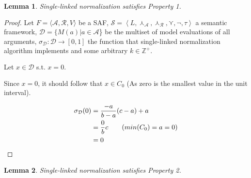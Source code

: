 \documentclass{article}
\newtheorem{lemma}{Lemma}
\newcommand{\real}{\mathbb{R}}  %
\newcommand{\args}{\mathcal{A}} %
\newcommand{\att}{\mathcal{R}}  %
\newcommand{\valueset}{L}
\newcommand{\safid}{F}               %
\newcommand{\saf}{\safid = \safbody} %
\newcommand{\safbody}{\langle \args, \att, V \rangle} %
\newcommand{\sembodyNew}{\left\langle \valueset,\SAFand_\mathcal{A}, \SAFand_\mathcal{R},\SAFor,\lnot,\tau \right\rangle} %
\newcommand{\SAFand}{\curlywedge}     %
\newcommand{\SAFor}{\curlyvee}        %
\newcommand{\sem}{\mathcal{S}}
\newcommand{\dataset}{\mathcal{D}}   %
\begin{document}
\begin{lemma}
Single-linked normalization satisfies Property 1.
\end{lemma}

\begin{proof}
Let $\saf$ be a SAF, $\sem = \sembodyNew$ a semantic framework, $\dataset = \{M(a)|a \in \args$\} be the multiset of model evaluations of all arguments, $\sigma_{\dataset}: \dataset  \rightarrow  [0,1]$ the function that single-linked normalization algorithm implements and some arbitrary $k \in \mathbb{Z}^{+}$. %


Let $x \in \dataset$ s.t. $x = 0$. 

Since $x = 0$, it should follow that $x \in C_0$ (As zero is the smallest value in the unit interval).

\begin{align*}
  \sigma_{\dataset}(0) 
  &= \dfrac{-a}{b-a} (c-a) + a
  \\ &=\dfrac{0}{b} c                   \tag{$min(C_0) = a = 0$}
  \\ &= 0                  \>    \qedhere
\end{align*}
 
\end{proof}

\begin{lemma}
Single-linked normalization satisfies Property 2.
\end{lemma}
\end{document}
